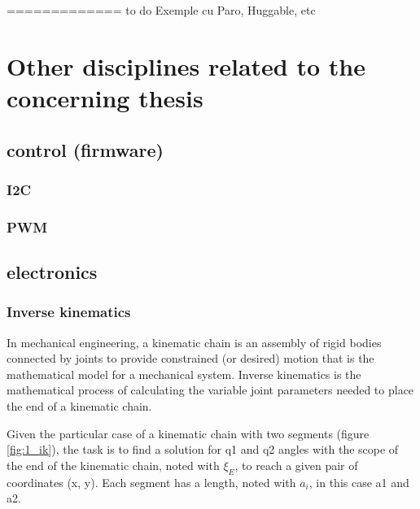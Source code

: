 \documentclass[runningheads,a4paper,12pt]{report}
\begin{document}
============= to do
Exemple cu Paro, Huggable, etc

\section{Other disciplines related to the concerning thesis}

\subsection{control (firmware)}
\subsubsection{I2C}
\label{section:i2c}
\subsubsection{PWM}
\label{section:pwm}

\subsection{electronics}
\label{section:servomotor}

\subsubsection*{Inverse kinematics}
\label{section:inverse-kinematics}
In mechanical engineering, a kinematic chain is an assembly of rigid bodies connected by joints to provide constrained (or desired) motion that is the mathematical model for a mechanical system. Inverse kinematics is the mathematical process of calculating the variable joint parameters needed to place the end of a kinematic chain.

Given the particular case of a kinematic chain with two segments (figure \ref{fig:1_ik}), the task is to find a solution for q1 and q2 angles with the scope of the end of the kinematic chain, noted with $\xi_E$, to reach a given pair of coordinates (x, y). Each segment has a length, noted with $a_i$, in this case a1 and a2. 
\end{document}
